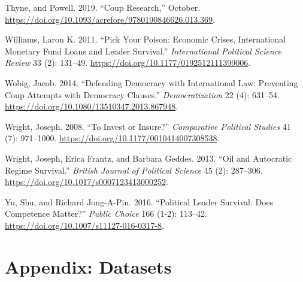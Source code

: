 \documentclass[
  12pt,
]{report}
\newlength{\cslhangindent}
\newenvironment{CSLReferences}[2] %
 {\begin{list}{}{%
  \setlength{\itemindent}{0pt}
  \setlength{\leftmargin}{0pt}
  \setlength{\parsep}{0pt}
  \ifodd #1
   \setlength{\leftmargin}{\cslhangindent}
   \setlength{\itemindent}{-1\cslhangindent}
  \fi
  \setlength{\itemsep}{#2\baselineskip}}}
 {\end{list}}
\begin{document}
\begin{CSLReferences}{1}{0}
Thyne, and Powell. 2019. {``Coup Research,''} October.
\url{https://doi.org/10.1093/acrefore/9780190846626.013.369}.

Williams, Laron K. 2011. {``Pick Your Poison: Economic Crises,
International Monetary Fund Loans and Leader Survival.''}
\emph{International Political Science Review} 33 (2): 131--49.
\url{https://doi.org/10.1177/0192512111399006}.

Wobig, Jacob. 2014. {``Defending Democracy with International Law:
Preventing Coup Attempts with Democracy Clauses.''}
\emph{Democratization} 22 (4): 631--54.
\url{https://doi.org/10.1080/13510347.2013.867948}.

Wright, Joseph. 2008. {``To Invest or Insure?''} \emph{Comparative
Political Studies} 41 (7): 971--1000.
\url{https://doi.org/10.1177/0010414007308538}.

Wright, Joseph, Erica Frantz, and Barbara Geddes. 2013. {``Oil and
Autocratic Regime Survival.''} \emph{British Journal of Political
Science} 45 (2): 287--306.
\url{https://doi.org/10.1017/s0007123413000252}.

Yu, Shu, and Richard Jong-A-Pin. 2016. {``Political Leader Survival:
Does Competence Matter?''} \emph{Public Choice} 166 (1-2): 113--42.
\url{https://doi.org/10.1007/s11127-016-0317-8}.

\end{CSLReferences}

\chapter*{\texorpdfstring{Appendix\textbf{:
Datasets}}{Appendix: Datasets}}\label{appendix-datasets}
\end{document}
